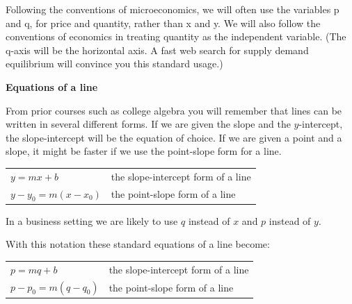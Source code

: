 \documentclass[10pt,]{book}
\newcommand{\terminology}[1]{\textbf{#1}}
\theoremstyle{plain}
\theoremstyle{definition}
\newenvironment{assemblage-untitled}{\mdfsetup{%
roundcorner=2ex, backgroundcolor=blue!5,linecolor=blue!75!black,}%
\begin{mdframed}}{\end{mdframed}}
\theoremstyle{definition}
\begin{document}
Following the conventions of microeconomics, we will often use the variables p and q, for price and quantity, rather than x and y.  We will also follow the conventions of economics in treating quantity as the independent variable.  (The q-axis will be the horizontal axis.  A fast web search for supply demand equilibrium will convince you this standard usage.)%
\par
\terminology{Equations of a line}%
\par
From prior courses such as college algebra you will remember that lines can be written in several different forms. If we are given the slope and the \(y\)-intercept, the slope-intercept will be the equation of choice. If we are given a point and a slope, it might be faster if we use the point-slope form for a line. %
\begin{assemblage-untitled}\label{KindsOfLinearEquations}
\leavevmode%
\begin{table}
\centering
\begin{tabular}{ll}
\(y=m x+b\)&the slope-intercept form of a line\tabularnewline[0pt]
\(y-y_0=m(x-x_0)\)&the point-slope form of a line
\end{tabular}
\end{table}
\end{assemblage-untitled}
\par
In a business setting we are likely to use \(q\) instead of \(x\) and \(p\) instead of \(y\). %
\par
With this notation these standard equations of a line become:%
\begin{assemblage-untitled}\label{PQLinearEquations}
\leavevmode%
\begin{table}
\centering
\begin{tabular}{ll}
\(p=m q+b\)&the slope-intercept form of a line\tabularnewline[0pt]
\(p-p_0=m(q-q_0)\)&the point-slope form of a line
\end{tabular}
\end{table}
\end{assemblage-untitled}
\end{document}
